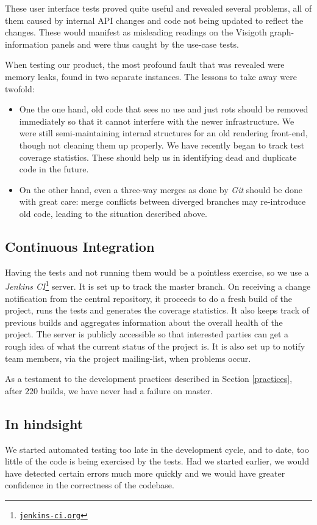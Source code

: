 \documentclass[a4paper,11pt,titlepage]{article}
\let\stdhref\href
\renewcommand{\href}[2]{\stdhref{#1}{\texttt{#2}}}
\newcommand{\buzz}[1]{\emph{#1}}
\newcommand{\Git}{\buzz{Git} }
\begin{document}
These user interface tests proved quite useful and revealed several
problems, all of them caused by internal API changes and code not
being updated to reflect the changes. These would manifest as
misleading readings on the Visigoth graph-information panels and were
thus caught by the use-case tests.

When testing our product, the most profound fault that was revealed
were memory leaks, found in two separate instances. The lessons to
take away were twofold:
\begin{itemize}
  \item One the one hand, old code that sees no use and just rots
    should be removed immediately so that it cannot interfere with the
    newer infrastructure. We were still semi-maintaining internal
    structures for an old rendering front-end, though not cleaning
    them up properly. We have recently began to track test coverage
    statistics. These should help us in identifying dead and duplicate
    code in the future.
  \item On the other hand, even a three-way merges as done by \Git
    should be done with great care: merge conflicts between diverged
    branches may re-introduce old code, leading to the situation
    described above.
\end{itemize}

\subsection{Continuous Integration}
Having the tests and not running them would be a pointless exercise,
so we use a \buzz{Jenkins
CI}\footnote{\href{http://jenkins-ci.org/}{jenkins-ci.org}} server. It
is set up to track the master branch. On receiving a change
notification from the central repository, it proceeds to do a fresh
build of the project, runs the tests and generates the coverage
statistics. It also keeps track of previous builds and aggregates
information about the overall health of the project.  The server is
publicly accessible so that interested parties can get a rough idea of
what the current status of the project is. It is also set up to notify
team members, via the project mailing-list, when problems occur.

As a testament to the development practices described in Section
\ref{practices}, after $220$ builds, we have never had a failure on
master.

\subsection{In hindsight}
We started automated testing too late in the development cycle, and to
date, too little of the code is being exercised by the tests. Had we
started earlier, we would have detected certain errors much more
quickly and we would have greater confidence in the correctness of the
codebase.
\end{document}
